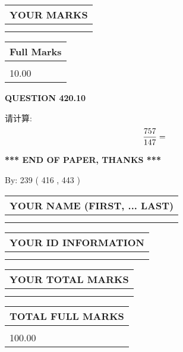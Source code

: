 \documentclass{ctexart}
\begin{document}
 
  
\vspace{0.2in}
  
\noindent\begin{tabular}{|l|}
\hline
 YOUR MARKS  \\
\hline
 \\ 
 \\ 
\hline
\end{tabular}
\hspace{0.05in} \begin{tabular}{|l|}
\hline
 Full Marks  \\
\hline
 \\ 
10.00 \\
\hline
\end{tabular}
{\textbf{\Large{QUESTION
420.10 
}}}
  
  
 
请计算:
\begin{equation}
\frac { %
757 }  {  %
147} = \nonumber
\end{equation}
 

 

 
   
   
 \vspace{0.2in}
 
   
   
   
   
\vspace{1.0in} 
{\textbf{\large{ *** END OF PAPER, THANKS *** }}} 
   
   
\hspace{1.0in} By: 
 239 ( 416 ,  443 )
   
   
   
   
\newpage 
\setcounter{page}{ 
   421001 } 
   
   
   
   
\noindent\begin{tabular}{|l|}
\hline
YOUR NAME (FIRST, ... LAST)  \\
\hline
 \\ 
 \\ 
\hline
\end{tabular}
\hspace{0.05in} \begin{tabular}{|l|}
\hline
 YOUR   ID   INFORMATION  \\
\hline
 \\ 
 \\ 
\hline
\end{tabular}
   
   
\vspace{0.2in}\noindent\begin{tabular}{|l|}
\hline
YOUR TOTAL MARKS  \\
\hline
 \\ 
 \\ 
\hline
\end{tabular}
\hspace{0.05in} \begin{tabular}{|l|}
\hline
TOTAL FULL MARKS  \\
\hline
 \\ 
100.00 \\
\hline
\end{tabular}
   
\end{document}
